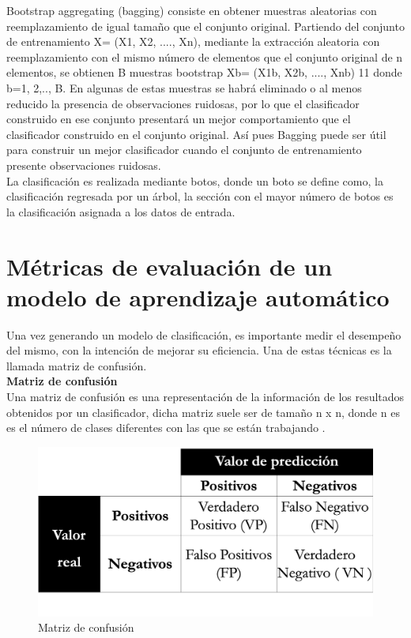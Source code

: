 Bootstrap aggregating (bagging) consiste en obtener muestras aleatorias con reemplazamiento de igual tamaño que el conjunto original\citep{CT24}. Partiendo del conjunto de entrenamiento X= (X1, X2, ...., Xn), mediante la extracción aleatoria con reemplazamiento con el mismo número de elementos que el conjunto original de n elementos, se obtienen B muestras bootstrap Xb= (X1b, X2b, ...., Xnb)
11
donde b=1, 2,.., B. En algunas de estas muestras se habrá eliminado o al menos reducido la presencia de observaciones ruidosas, por lo que el clasificador construido en ese conjunto presentará un mejor comportamiento que el clasificador construido en el conjunto original. Así pues Bagging puede ser útil para construir un mejor clasificador cuando el conjunto de entrenamiento presente observaciones ruidosas.\\

La clasificación es realizada mediante botos, donde un boto se define como, la clasificación regresada por un árbol, la sección con el mayor número de botos es la clasificación asignada a los datos de entrada.





\section[Métricas de evaluación]{Métricas de evaluación de un modelo de aprendizaje automático}

Una vez generando un modelo de clasificación, es importante medir el desempeño del mismo, con
la intención de mejorar su eficiencia. Una de estas técnicas es la llamada matriz de confusión.\\

\textbf{Matriz de confusión}\\

Una matriz de confusión es una representación de la información de los resultados obtenidos por un
clasificador, dicha matriz suele ser de tamaño n x n, donde n es es el número de clases diferentes con
las que se están trabajando \citep{CT23}.

\begin{figure}
	\centering
	\includegraphics[scale=.4]{imagenes/Capitulo3/MatrizC.png}
	\caption{Matriz de confusión}
	\label{Fig:mconfu}
\end{figure}

